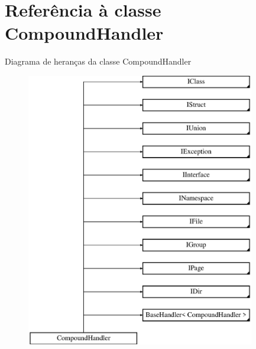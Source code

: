 \hypertarget{class_compound_handler}{\section{Referência à classe Compound\-Handler}
\label{class_compound_handler}
}
Diagrama de heranças da classe Compound\-Handler\begin{figure}[H]
\begin{center}
\leavevmode
\includegraphics[height=12.000000cm]{class_compound_handler}
\end{center}
\end{figure}
